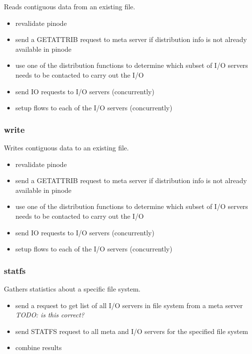 \documentclass[11pt, letterpaper]{article}
\begin{document}
Reads contiguous data from an existing file.  

\begin{itemize}
\item revalidate pinode
\item send a GETATTRIB request to meta server if distribution info is not
already available in pinode
\item use one of the distribution functions to determine which subset of
I/O servers needs to be contacted to carry out the I/O
\item send IO requests to I/O servers (concurrently)
\item setup flows to each of the I/O servers (concurrently)
\end{itemize}

\subsubsection{write}

Writes contiguous data to an existing file. 

\begin{itemize}
\item revalidate pinode
\item send a GETATTRIB request to meta server if distribution info is not
already available in pinode
\item use one of the distribution functions to determine which subset of
I/O servers needs to be contacted to carry out the I/O
\item send IO requests to I/O servers (concurrently)
\item setup flows to each of the I/O servers (concurrently)
\end{itemize}

\subsubsection{statfs}

Gathers statistics about a specific file system.

\begin{itemize}
\item send a request to get list of all I/O servers in file system from
a meta server \emph{TODO: is this correct?}
\item send STATFS request to all meta and I/O servers for the specified
file system
\item combine results
\end{itemize}
\end{document}
